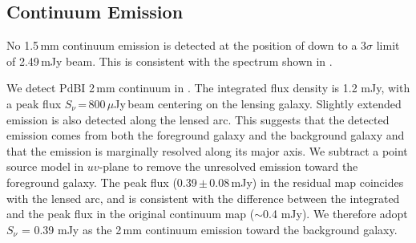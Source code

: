 \documentclass[]{emulateapj}
\begin{document}
\subsection{Continuum Emission} %
No 1.5\,mm continuum emission is detected at the position of \cco
down to a 3$\sigma$ limit of 2.49\,mJy beam\pmOne.
This is consistent with the spectrum shown in .

We detect PdBI 2\,mm continuum in . The integrated flux density is
1.2 mJy, with a peak flux
$S_\nu$\,=\,800\,$\mu$Jy\,beam\pmOne
centering on the lensing galaxy. Slightly extended emission is also detected
along the lensed arc. This suggests that the detected emission comes from
both the foreground galaxy and the background galaxy and that the
emission is marginally resolved along its major axis.
We subtract a point source model in $uv$-plane to remove the unresolved
emission toward the foreground galaxy. The peak flux (0.39\,$\pm$\,0.08\,mJy)
in the residual map coincides with the lensed arc, and is consistent with
the difference between the integrated and the peak flux in the
original continuum map ($\sim$0.4 mJy). We therefore adopt
$S_\nu$ = 0.39 mJy as the 2\,mm continuum emission toward
the background galaxy.
\end{document}

